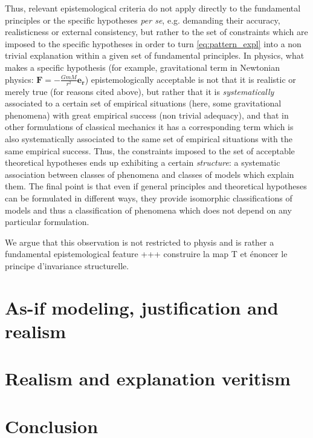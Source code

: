 \documentclass[a4paper,11pt]{article}
\theoremstyle{definition}
\begin{document}
Thus, relevant epistemological criteria do not apply directly to the fundamental principles or the specific hypotheses \textit{per se}, e.g. demanding their accuracy, realisticness or external consistency, but rather to the set of constraints which are imposed to the specific hypotheses in order to turn \eqref{eq:pattern_expl} into a non trivial explanation within a given set of fundamental principles. In physics, what makes a specific hypothesis (for example, gravitational term in Newtonian physics: $\mathbf{F}=-\frac{GmM}{r^2}\mathbf{e_r}$) epistemologically acceptable is not that it is realistic or merely true (for reasons cited above), but rather that it is \textit{systematically} associated to a certain set of empirical situations (here, some gravitational phenomena) with great empirical success (non trivial adequacy), and that in other formulations of classical mechanics it has a corresponding term which is also systematically associated to the same set of empirical situations with the same empirical success. Thus, the constraints imposed to the set of acceptable theoretical hypotheses ends up exhibiting a certain \textit{structure}: a systematic association between classes of phenomena and classes of models which explain them. The final point is that even if general principles and theoretical hypotheses can be formulated in different ways, they provide isomorphic classifications of models and thus a classification of phenomena which does not depend on any particular formulation. 


We argue that this observation is not restricted to physis and is rather a fundamental epistemological feature +++ construire la map T et énoncer le principe d'invariance structurelle. 


\section{As-if modeling, justification and realism}
\label{sec:asif_realism}
\section{Realism and explanation veritism}

\section{Conclusion}

 

\end{document}
